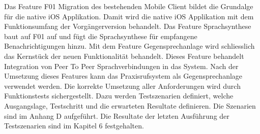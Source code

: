 Das Feature F01 Migration des bestehenden Mobile Client bildet die Grundalge für die native iOS Applikation.
Damit wird die native iOS Applikation mit dem Funktionsumfang der Vorgängerversion behandelt.
Das Feature Sprachsynthese baut auf F01 auf und fügt die Sprachsynthese für empfangene Benachrichtigungen hinzu.
Mit dem Feature Gegensprechanlage wird schliesslich das Kernstück der neuen Funktionalität behandelt.
Dieses Feature behandelt Integration von Peer To Peer Sprachverbindungen in das System.
Nach der Umsetzung dieses Features kann das Praxisrufsystem als Gegensprechanlage verwendet werden.
Die korrekte Umsetzung aller Anforderungen wird durch Funktionstests sichergestellt.
Dazu werden Testszenarien definiert, welche Ausgangslage, Testschritt und die erwarteten Resultate definieren.
Die Szenarien sind im Anhang D aufgeführt.
Die Resultate der letzten Ausführung der Testszenarien sind im Kapitel 6 festgehalten.

\clearpage

